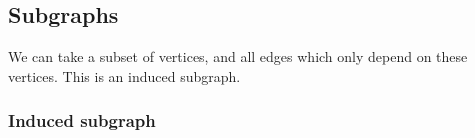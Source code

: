 
\subsection{Subgraphs}

We can take a subset of vertices, and all edges which only depend on these vertices. This is an induced subgraph.

\subsubsection{Induced subgraph}

